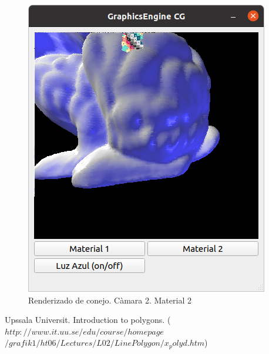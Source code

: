 \documentclass[12pt]{article}
\begin{document}
\begin{figure}[H]
\centering
\includegraphics[scale=0.5]{images/ej5.png}
\caption{Renderizado de conejo. Càmara 2. Material 2}
\end{figure}




\begin{thebibliography}{99}

 Upssala Universit. Introduction to polygons. ($http://www.it.uu.se/edu/course/homepage$\\$/grafik1/ht06/Lectures/L02/LinePolygon/x_polyd.htm$)
\end{thebibliography}
\end{document}

